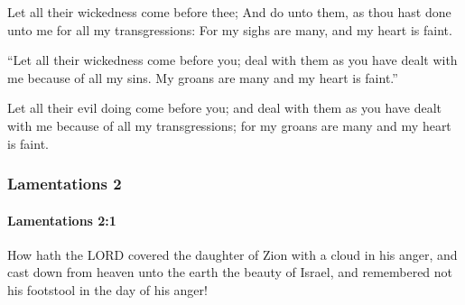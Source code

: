 			\begin{versebox}
					\item[BHS] 
					\item[LXX] 
					\item[ASV] Let all their wickedness come before thee; And do unto them, as thou hast done unto me for all my transgressions: For my sighs are many, and my heart is faint.
					\item[NIV] “Let all their wickedness come before you; deal with them as you have dealt with me because of all my sins. My groans are many and my heart is faint.”
					\item[NRSV] Let all their evil doing come before you; and deal with them as you have dealt with me because of all my transgressions; for my groans are many and my heart is faint.
			\end{versebox}
	\subsubsection{Lamentations 2} %
		\label{LAMENTATIONS-2}

		\paragraph{Lamentations 2:1} %
			\label{LAMENTATIONS-2-1}

			How hath the LORD covered the daughter of Zion with a cloud in his anger, and cast down from heaven unto the earth the beauty of Israel, and remembered not his footstool in the day of his anger!

